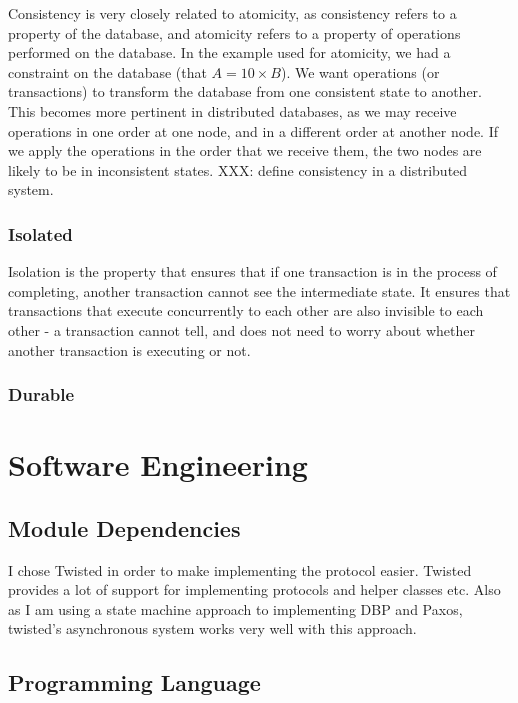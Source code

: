 \documentclass[12pt,twoside,notitlepage]{report}
\begin{document}
Consistency is very closely related to atomicity, as consistency refers to a property of the
database, and atomicity refers to a property of operations performed on the database. In the
example used for atomicity, we had a constraint on the database (that $A = 10\times B$). We want operations
(or transactions) to transform the database from one consistent state to another. This becomes
more pertinent in distributed databases, as we may receive operations in one order at one node,
and in a different order at another node. If we apply the operations in the order that we receive
them, the two nodes are likely to be in inconsistent states. XXX: define consistency in a
distributed system.

\subsubsection*{Isolated}

Isolation is the property that ensures that if one transaction is in the process of completing,
another transaction cannot see the intermediate state. It ensures that transactions that execute
concurrently to each other are also invisible to each other - a transaction cannot tell, and does
not need to worry about whether another transaction is executing or not.

\subsubsection*{Durable}



\section{Software Engineering}

\subsection{Module Dependencies}

I chose Twisted in order to make implementing the protocol easier. Twisted provides a lot of
support for implementing protocols and helper classes etc. Also as I am using a state machine
approach to implementing DBP and Paxos, twisted's asynchronous system works very well with this
approach.

\subsection{Programming Language}
\end{document}
